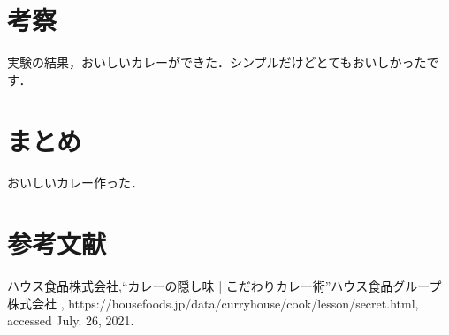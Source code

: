 \documentclass[a4paper, 11pt]{jsarticle}
\begin{document}
\section{考察}

実験の結果，おいしいカレーができた．シンプルだけどとてもおいしかったです．

\section{まとめ}

おいしいカレー作った．

\section{参考文献}
\begin{thebibliography}{9}
{ハウス食品株式会社},``カレーの隠し味 | こだわりカレー術''ハウス食品グループ株式会社 , https://housefoods.jp/data/curryhouse/cook/lesson/secret.html, accessed July. 26, 2021.
\end{thebibliography}
\end{document}
